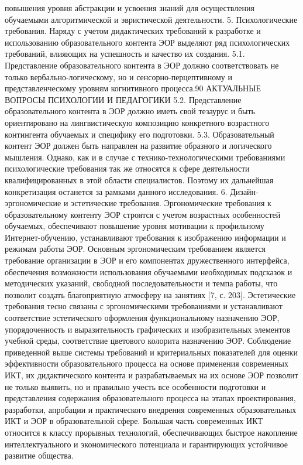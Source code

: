 повышения уровня абстракции и усвоения знаний для осуществления обучаемыми алгоритмической и эвристической деятельности.
5. Психологические требования.
Наряду с учетом дидактических требований к разработке и использованию образовательного контента ЭОР выделяют ряд психологических требований, влияющих на успешность и качество их создания.
5.1. Представление образовательного контента в ЭОР должно соответствовать не только вербально-логическому, но и сенсорно-перцептивному и
представленческому уровням когнитивного процесса.90
АКТУАЛЬНЫЕ ВОПРОСЫ ПСИХОЛОГИИ И ПЕДАГОГИКИ
5.2. Представление образовательного контента в ЭОР должно иметь
свой тезаурус и быть ориентировано на лингвистическую композицию конкретного возрастного контингента обучаемых и специфику его подготовки.
5.3. Образовательный контент ЭОР должен быть направлен на развитие
образного и логического мышления.
Однако, как и в случае с технико-технологическими требованиями психологические требования так же относятся к сфере деятельности квалифицированных в этой области специалистов. Поэтому их дальнейшая конкретизация останется за рамками данного исследования.
6. Дизайн-эргономические и эстетические требования.
Эргономические требования к образовательному контенту ЭОР строятся с учетом возрастных особенностей обучаемых, обеспечивают повышение
уровня мотивации к профильному Интернет-обучению, устанавливают требования к изображению информации и режимам работы ЭОР. Основным
эргономическим требованием является требование организации в ЭОР и его
компонентах дружественного интерфейса, обеспечения возможности использования обучаемыми необходимых подсказок и методических указаний,
свободной последовательности и темпа работы, что позволит создать благоприятную атмосферу на занятиях [7, с. 203].
Эстетические требования тесно связаны с эргономическими требованиями и устанавливают соответствие эстетического оформления функциональному назначению ЭОР, упорядоченность и выразительность графических и изобразительных элементов учебной среды, соответствие цветового
колорита назначению ЭОР.
Соблюдение приведенной выше системы требований и критериальных
показателей для оценки эффективности образовательного процесса на основе
применения современных ИКТ, их дидактического контента и разрабатываемых на их основе ЭОР позволит не только выявить, но и правильно учесть все
особенности подготовки и представления содержания образовательного процесса на этапах проектирования, разработки, апробации и практического внедрения современных образовательных ИКТ и ЭОР в образовательной сфере.
Большая часть современных ИКТ относится к классу прорывных технологий, обеспечивающих быстрое накопление интеллектуального и экономического потенциала и гарантирующих устойчивое развитие общества.
